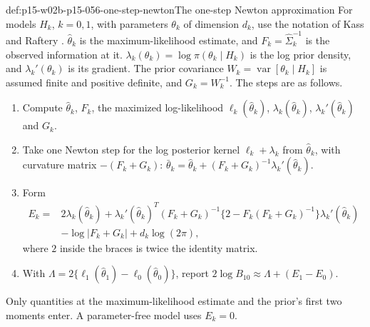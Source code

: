 \begin{hbmethod}{def:p15-w02b-p15-056-one-step-newton}{The one-step Newton approximation}
For models \(H_k\), \(k=0,1\), with parameters \(\theta_k\) of dimension
\(d_k\), use the notation of Kass and Raftery
\cite[Sec.~4.1.2, eqs.~(7)--(8), p.~778]{KassRaftery1995BayesFactors}.
\(\widehat\theta_k\) is the maximum-likelihood estimate, and
\(F_k=\widehat\Sigma_k^{-1}\) is the observed information at it.
\(\lambda_k(\theta_k)=\log\pi(\theta_k\mid H_k)\) is the log prior
density, and \(\lambda_k'(\theta_k)\) is its gradient. The prior
covariance \(W_k=\operatorname{var}[\theta_k\mid H_k]\) is assumed
finite and positive definite, and \(G_k=W_k^{-1}\). The steps are as
follows.
\begin{enumerate}
\item Compute \(\widehat\theta_k\), \(F_k\), the maximized
log-likelihood \(\ell_k(\widehat\theta_k)\),
\(\lambda_k(\widehat\theta_k)\), \(\lambda_k'(\widehat\theta_k)\) and \(G_k\).
\item Take one Newton step for the log posterior kernel
\(\ell_k+\lambda_k\) from \(\widehat\theta_k\), with curvature matrix
\(-(F_k+G_k)\):
\(\bar\theta_k=\widehat\theta_k+(F_k+G_k)^{-1}\lambda_k'(\widehat\theta_k)\).
\item Form
\[
\begin{split}
 E_k={}&2\lambda_k(\widehat\theta_k)
 +\lambda_k'(\widehat\theta_k)^T(F_k+G_k)^{-1}
   \{2-F_k(F_k+G_k)^{-1}\}\lambda_k'(\widehat\theta_k)\\
 &-\log|F_k+G_k|+d_k\log(2\pi),
\end{split}
\]
where \(2\) inside the braces is twice the identity matrix.
\item With \(\Lambda=2\{\ell_1(\widehat\theta_1)-\ell_0(\widehat\theta_0)\}\),
report \(2\log B_{10}\approx\Lambda+(E_1-E_0)\).
\end{enumerate}
Only quantities at the maximum-likelihood estimate and the prior's first
two moments enter. A parameter-free model uses \(E_k=0\).
\end{hbmethod}

